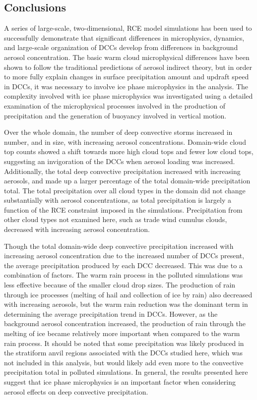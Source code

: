 \subsection{Conclusions}
A series of large-scale, two-dimensional, RCE model simulations has been used to successfully demonstrate that significant differences in microphysics, dynamics, and large-scale organization of DCCs develop from differences in background aerosol concentration.  The basic warm cloud microphysical differences have been shown to follow the traditional predictions of aerosol indirect theory, but in order to more fully explain changes in surface precipitation amount and updraft speed in DCCs, it was necessary to involve ice phase microphysics in the analysis.  The complexity involved with ice phase microphysics was investigated using a detailed examination of the microphysical processes involved in the production of precipitation and the generation of buoyancy involved in vertical motion.

Over the whole domain, the number of deep convective storms increased in number, and in size, with increasing aerosol concentrations.  Domain-wide cloud top counts showed a shift towards more high cloud tops and fewer low cloud tops, suggesting an invigoration of the DCCs when aerosol loading was increased.  Additionally, the total deep convective precipitation increased with increasing aerosols, and made up a larger percentage of the total domain-wide precipitation total.  The total precipitation over all cloud types in the domain did not change substantially with aerosol concentrations, as total precipitation is largely a function of the RCE constraint imposed in the simulations.  Precipitation from other cloud types not examined here, such as trade wind cumulus clouds, decreased with increasing aerosol concentration.

Though the total domain-wide deep convective precipitation increased with increasing aerosol concentration due to the increased number of DCCs present, the average precipitation produced by each DCC decreased.  This was due to a combination of factors.  The warm rain process in the polluted simulations was less effective because of the smaller cloud drop sizes.  The production of rain through ice processes (melting of hail and collection of ice by rain) also decreased with increasing aerosols, but the warm rain reduction was the dominant term in determining the average precipitation trend in DCCs.  However, as the background aerosol concentration increased, the production of rain through the melting of ice became relatively more important when compared to the warm rain process.  It should be noted that some precipitation was likely produced in the stratiform anvil regions associated with the DCCs studied here, which was not included in this analysis, but would likely add even more to the convective precipitation total in polluted simulations.  In general, the results presented here suggest that ice phase microphysics is an important factor when considering aerosol effects on deep convective precipitation.

